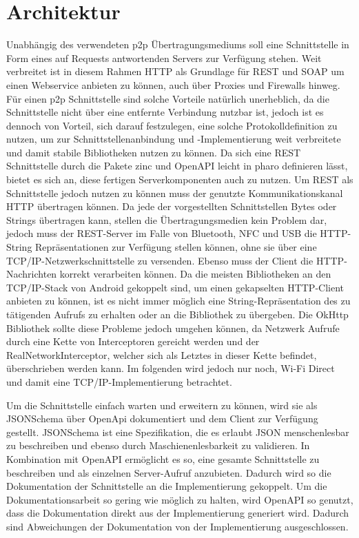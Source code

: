 \section{Architektur}

    Unabhängig des verwendeten p2p Übertragungsmediums soll eine Schnittstelle in Form eines auf Requests antwortenden Servers zur Verfügung stehen.
	Weit verbreitet ist in diesem Rahmen HTTP als Grundlage für REST und SOAP um einen Webservice anbieten zu können, auch über Proxies und Firewalls hinweg. Für einen p2p Schnittstelle sind solche Vorteile natürlich unerheblich, da die Schnittstelle nicht über eine entfernte Verbindung nutzbar ist, jedoch ist es dennoch von Vorteil, sich darauf festzulegen, eine solche Protokolldefinition zu nutzen, um zur Schnittstellenanbindung und -Implementierung weit verbreitete und damit stabile Bibliotheken nutzen zu können.
    Da sich eine REST Schnittstelle durch die Pakete zinc \cite{pharoZinc} und OpenAPI \cite{pharoOpenApi} leicht in pharo definieren lässt, bietet es sich an, diese fertigen Serverkomponenten auch zu nutzen.
    Um REST als Schnittstelle jedoch nutzen zu können muss der genutzte Kommunikationskanal HTTP übertragen können. Da jede der vorgestellten Schnittstellen Bytes oder Strings
    übertragen kann, stellen die Übertragungsmedien kein Problem dar, jedoch muss der REST-Server im Falle von Bluetooth, NFC und USB die HTTP-String Repräsentationen zur Verfügung stellen können,
    ohne sie über eine TCP/IP-Netzwerkschnittstelle zu versenden. Ebenso muss der Client die HTTP-Nachrichten korrekt verarbeiten können.
    Da die meisten Bibliotheken an den TCP/IP-Stack von Android gekoppelt sind, um einen gekapselten HTTP-Client anbieten zu können, ist es nicht immer möglich eine String-Repräsentation des zu tätigenden Aufrufs zu erhalten oder an die Bibliothek zu übergeben.
    Die OkHttp Bibliothek \cite{AndroidOkHttp} sollte diese Probleme jedoch umgehen können, da Netzwerk Aufrufe durch eine Kette von Interceptoren gereicht werden und der RealNetworkInterceptor,
    welcher sich als Letztes in dieser Kette befindet, überschrieben werden kann.
	Im folgenden wird jedoch nur noch, Wi-Fi Direct und damit eine TCP/IP-Implementierung betrachtet.
	
    Um die Schnittstelle einfach warten und erweitern zu können, wird sie als JSONSchema über OpenApi dokumentiert und dem Client zur Verfügung gestellt.
    JSONSchema ist eine Spezifikation, die es erlaubt JSON menschenlesbar zu beschreiben und ebenso durch Maschienenlesbarkeit zu validieren.\cite{JsonSchema} In Kombination mit OpenAPI ermöglicht es so, eine gesamte Schnittstelle zu beschreiben und als einzelnen Server-Aufruf anzubieten.\cite{OpenApi} Dadurch wird so die Dokumentation der Schnittstelle an die Implementierung gekoppelt. Um die Dokumentationsarbeit so gering wie möglich zu halten, wird OpenAPI so genutzt, dass die Dokumentation direkt aus der Implementierung generiert wird. Dadurch sind Abweichungen der Dokumentation von der Implementierung ausgeschlossen.

